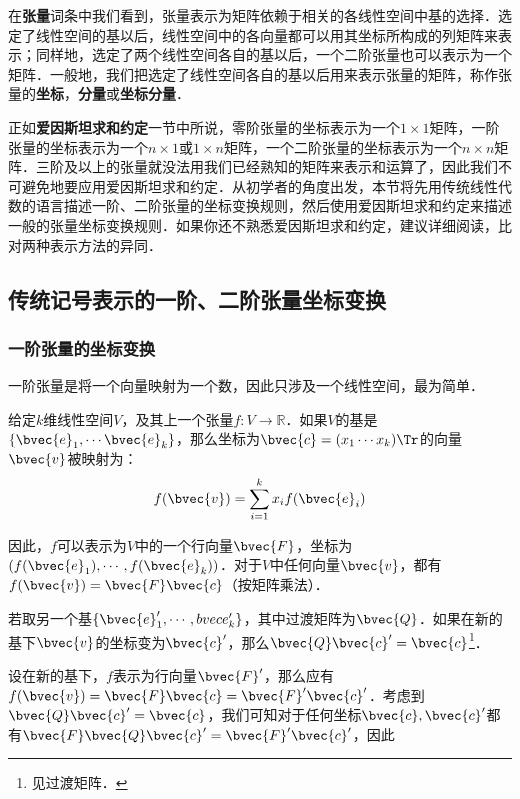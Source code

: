 




在\textbf{张量}词条中我们看到，张量表示为矩阵依赖于相关的各线性空间中基的选择．选定了线性空间的基以后，线性空间中的各向量都可以用其坐标所构成的列矩阵来表示；同样地，选定了两个线性空间各自的基以后，一个二阶张量也可以表示为一个矩阵．一般地，我们把选定了线性空间各自的基以后用来表示张量的矩阵，称作张量的\textbf{坐标}，\textbf{分量}或\textbf{坐标分量}．

正如\textbf{爱因斯坦求和约定}一节中所说，零阶张量的坐标表示为一个$1\times 1$矩阵，一阶张量的坐标表示为一个$n\times 1$或$1\times n$矩阵，一个二阶张量的坐标表示为一个$n\times n$矩阵．三阶及以上的张量就没法用我们已经熟知的矩阵来表示和运算了，因此我们不可避免地要应用爱因斯坦求和约定．从初学者的角度出发，本节将先用传统线性代数的语言描述一阶、二阶张量的坐标变换规则，然后使用爱因斯坦求和约定来描述一般的张量坐标变换规则．如果你还不熟悉爱因斯坦求和约定，建议详细阅读，比对两种表示方法的异同．

\subsection{传统记号表示的一阶、二阶张量坐标变换}
\subsubsection{一阶张量的坐标变换}
一阶张量是将一个向量映射为一个数，因此只涉及一个线性空间，最为简单．

给定$k$维线性空间$V$，及其上一个张量$f:V\rightarrow\mathbb{R}$．如果$V$的基是$\{\bvec{e}_1, \cdots\bvec{e}_k\}$，那么坐标为$\bvec{c}=(x_1\cdots x_k)\Tr$的向量$\bvec{v}$被映射为：
\begin{equation}
f(\bvec{v})=\sum\limits_{i=1}^k x_if(\bvec{e}_i)
\end{equation}

因此，$f$可以表示为$V$中的一个行向量$\bvec{F}$，坐标为$(f(\bvec{e}_1), \cdots, f(\bvec{e}_k))$．对于$V$中任何向量$\bvec{v}$，都有$f(\bvec{v})=\bvec{F}\bvec{c}$（按矩阵乘法）．

若取另一个基$\{\bvec{e}_1', \cdots, \\bvec{e}_k'\}$，其中过渡矩阵为$\bvec{Q}$．如果在新的基下$\bvec{v}$的坐标变为$\bvec{c}'$，那么$\bvec{Q}\bvec{c}'=\bvec{c}$\footnote{见过渡矩阵．}．

设在新的基下，$f$表示为行向量$\bvec{F}'$，那么应有$f(\bvec{v})=\bvec{F}\bvec{c}=\bvec{F}'\bvec{c}'$．考虑到$\bvec{Q}\bvec{c}'=\bvec{c}$，我们可知对于任何坐标$\bvec{c}, \bvec{c}'$都有$\bvec{F}\bvec{Q}\bvec{c}'=\bvec{F}'\bvec{c}'$，因此

